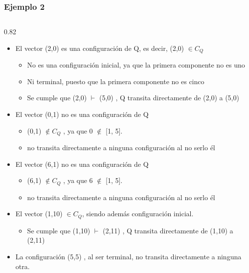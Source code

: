 \documentclass[xcolor=table]{beamer}
\begin{document}
\begin{frame}[fragile]\frametitle{Ejemplo 2} \footnotesize  

\begin{columns}


    \begin{column}{0.82\textwidth}
    \begin{itemize}
        \item  El vector (2,0) es una configuración de Q, es decir, (2,0) $\in C_Q$

                \begin{itemize}\scriptsize  
                    \item No es una configuración inicial, ya que la primera componente no es uno
                    \item Ni terminal, puesto que la primera componente no es cinco
                    \item Se cumple que (2,0) $\vdash$ (5,0) , Q transita directamente de (2,0) a (5,0)
                \end{itemize}
        \item  El vector (0,1) no es una configuración de Q        
                \begin{itemize}\scriptsize  
                    \item (0,1) $\notin C_Q$ , ya que 0 $\notin$ [1, 5].
                    \item no transita directamente a ninguna configuración al no serlo él
                \end{itemize}
        \item  El vector (6,1) no es una configuración de Q        
                \begin{itemize}\scriptsize  
                    \item (6,1) $\notin C_Q$ , ya que 6 $\notin$ [1, 5].
                    \item no transita directamente a ninguna configuración al no serlo él
                \end{itemize}
        \item  El vector (1,10) $\in C_Q$, siendo además configuración inicial.   
                \begin{itemize}\scriptsize  
                    \item Se cumple que (1,10)  $\vdash$ (2,11) , Q transita directamente de (1,10) a (2,11)
                \end{itemize}    
        \item  La configuración (5,5) , al ser terminal, no transita directamente a ninguna otra.
        

\end{itemize}
\end{column}
\end{columns}
\end{frame}
\end{document}
